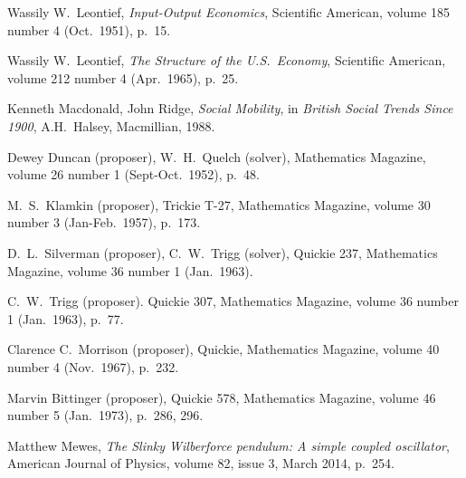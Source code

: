 \begin{thebibliography}{\makebox[2em][c]{{}\hfil{}}}

  Wassily W.\ Leontief,
  \emph{Input-Output Economics},
  Scientific American,
  volume 185 number 4 (Oct.\ 1951),
  p.~15. 

  Wassily W.\ Leontief,
  \emph{The Structure of the U.S.\ Economy},
  Scientific American,
  volume 212 number 4 (Apr.\ 1965),
  p.~25. 


  Kenneth Macdonald, John Ridge,
  \emph{Social Mobility},
  in \emph{British Social Trends Since 1900},
  A.H.~Halsey,
  Macmillian, 1988.


  Dewey Duncan (proposer), W.\ H.\ Quelch (solver),
  Mathematics Magazine,
  volume 26 number 1 (Sept-Oct.\ 1952),
  p.~48.

  M.\ S.\ Klamkin (proposer),
  Trickie T-27,
  Mathematics Magazine,
  volume 30 number 3 (Jan-Feb.\ 1957),
  p.~173.

  D.\ L.\ Silverman (proposer), C.\ W.\ Trigg (solver),
  Quickie 237,
  Mathematics Magazine,
  volume 36 number 1 (Jan.\ 1963).

  C.\ W.\ Trigg (proposer).
  Quickie 307,
  Mathematics Magazine,
  volume 36 number 1 (Jan.\ 1963),
  p.~77.

  Clarence C.\ Morrison (proposer),
  Quickie,
  Mathematics Magazine,
  volume 40 number 4 (Nov.\ 1967),
  p.~232.

  Marvin Bittinger (proposer),
  Quickie 578,
  Mathematics Magazine,
  volume 46 number 5 (Jan.\ 1973),
  p.~286, 296.

  Matthew Mewes,
  \emph{The Slinky Wilberforce pendulum: A simple coupled oscillator},
  American Journal of Physics,
  volume 82, issue 3, March 2014,
  p.~254.


\end{thebibliography}
